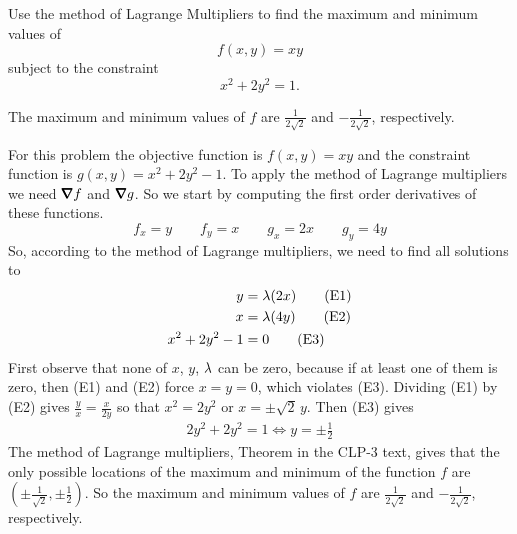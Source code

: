 \begin{question}[M200 2006D] %
Use the method of Lagrange Multipliers to find the maximum
and minimum values of
\begin{equation*}
f(x, y) = xy
\end{equation*}
subject to the constraint
\begin{equation*}
x^2 + 2y^2 = 1.
\end{equation*}
\end{question}

%

\begin{answer}
The maximum and minimum values of $f$ are $\frac{1}{2\sqrt{2}}$
and $-\frac{1}{2\sqrt{2}}$, respectively.
\end{answer}

\begin{solution}
For this problem the objective function is $f(x,y) = xy$
and the constraint function is $g(x,y)=x^2 + 2y^2 - 1$. 
To apply the method of Lagrange multipliers we need $\vnabla f$
and $\vnabla g$. So we start by computing the first order derivatives
of these functions.
\begin{equation*}
f_x=y\qquad
f_y=x\qquad
g_x=2x\qquad
g_y=4y
\end{equation*}
So, according to the method of Lagrange multipliers, we need to find all solutions to
\begin{align*}
y&=\lambda (2x) \tag{E1}\\
x&=\lambda (4y)  \tag{E2}\\
x^2+2y^2-1&=0 \tag{E3}
\end{align*}
First observe that none of $x$, $y$, $\lambda$ can be zero, because if at
least one of them is zero, then (E1) and (E2) force $x=y=0$, which violates
(E3). Dividing (E1) by (E2) gives $\frac{y}{x} = \frac{x}{2y}$
so that $x^2=2y^2$ or $x=\pm \sqrt{2}\,y$. Then (E3) gives
\begin{align*}
2y^2+2y^2=1
\iff y=\pm\frac{1}{2}
\end{align*}
The method of Lagrange multipliers, Theorem 
in the CLP-3 text, gives
that the only possible locations of the maximum and minimum of the function
$f$ are $\left(\pm\frac{1}{\sqrt{2}},\pm\frac{1}{2}\right)$. 
So the maximum and minimum values of $f$ are $\frac{1}{2\sqrt{2}}$
and $-\frac{1}{2\sqrt{2}}$, respectively.
\end{solution}

